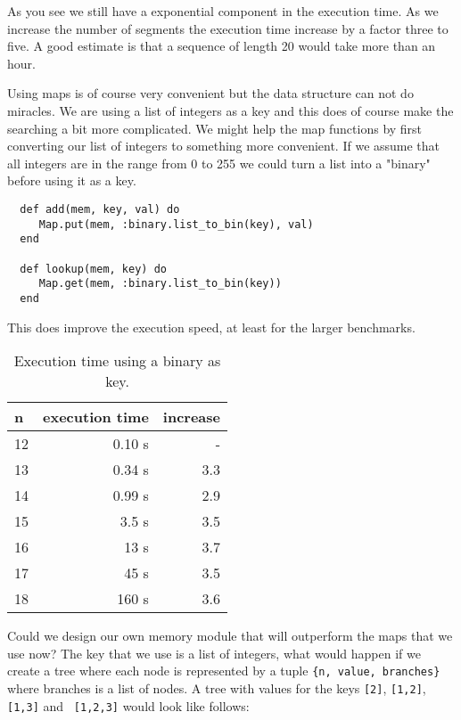 \documentclass[a4paper,11pt]{article}
\begin{document}
As you see we still have a exponential component in the execution
time. As we increase the number of segments the execution time
increase by a factor three to five. A good estimate is that a
sequence of length 20 would take more than an hour.

Using maps is of course very convenient but the data structure can not
do miracles. We are using a list of integers as a key and this does of
course make the searching a bit more complicated. We might help the
map functions by first converting our list of integers to something
more convenient. If we assume that all integers are in the range from
0 to 255 we could turn a list into a "binary" before using it as a
key.

\begin{verbatim}
  def add(mem, key, val) do 
     Map.put(mem, :binary.list_to_bin(key), val) 
  end  

  def lookup(mem, key) do 
     Map.get(mem, :binary.list_to_bin(key)) 
  end
\end{verbatim}

\noindent This does improve the execution speed, at least for the larger benchmarks. 

\begin{table}[h!]
  \begin{center}
    \begin{tabular}{l|r|r}
      \textbf{n} & \textbf{execution time} & \textbf{increase}\\
      \hline
      12	 &0.10 s&-\\ 
      13	 &0.34 s&3.3 \\ 
      14	 &0.99 s&2.9 \\ 
      15	 &3.5 s &3.5 \\ 
      16	 &13 s &3.7 \\ 
      17	 &45 s &3.5 \\ 
      18	 &160 s &3.6 \\ 
    \end{tabular}
    \caption{Execution time using a binary as key.}
  \end{center}
\end{table}


Could we design our own memory module that will outperform the maps
that we use now? The key that we use is a list of integers, what would
happen if we create a tree where each node is represented by a tuple
{\tt \{n, value, branches\}} where branches is a list of nodes. A tree
with values for the keys {\tt [2]}, {\tt [1,2]}, {\tt [1,3]} and {\tt
[1,2,3]} would look like follows:
\end{document}
